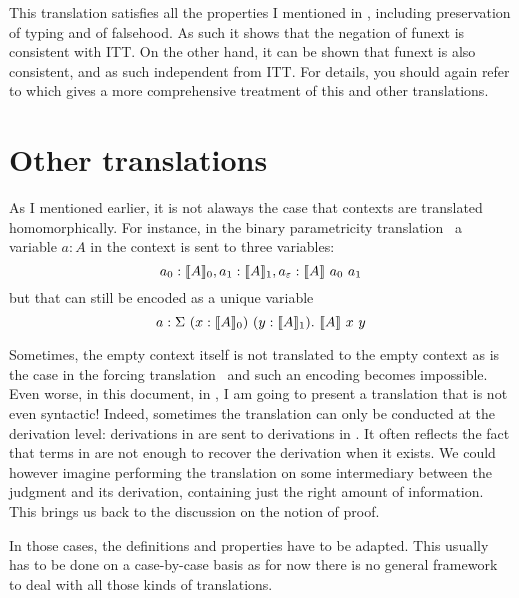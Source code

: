 This translation satisfies all the properties I mentioned in
, including preservation of typing and of falsehood.
As such it shows that the negation of \acrshort{funext} is consistent with
\acrshort{ITT}. On the other hand, it can be shown that \acrshort{funext} is
also consistent, and as such independent from \acrshort{ITT}.
For details, you should again refer to
which gives a more comprehensive treatment of this and other translations.

\section{Other translations}

As I mentioned earlier, it is not alaways the case that contexts are translated
homomorphically. For instance, in the binary parametricity
translation~ a variable
\(a : A\) in the context is sent to three variables:
\[
  a_0 : \llbracket A \rrbracket_0, a_1 : \llbracket A \rrbracket_1, a_\varepsilon : \llbracket A \rrbracket\ a_0\ a_1
\]
but that can still be encoded as a unique variable
\[
  a : \Sigma\ (x : \llbracket A \rrbracket_0)\ (y : \llbracket A \rrbracket_1).\ \llbracket A \rrbracket\ x\ y
\]

Sometimes, the empty context itself is not translated to the empty context
as is the case in the forcing translation~ and
such an encoding becomes impossible.
Even worse, in this document, in , I am going to
present a translation that is not even syntactic! Indeed, sometimes the
translation can only be conducted at the derivation level: derivations in \cS
are sent to derivations in \cT. It often reflects the fact that terms in \cS are
not enough to recover the derivation when it exists.
We could however imagine performing the translation on some intermediary between
the judgment and its derivation, containing just the right amount of
information. This brings us back to the discussion on the notion of
proof.

In those cases, the definitions and properties have to be adapted. This usually
has to be done on a case-by-case basis as for now there is no general framework
to deal with all those kinds of translations.

